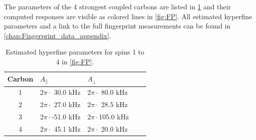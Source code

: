 The parameters of the 4 strongest coupled carbons are listed in \cref{tbl:HF_par} and their computed responses are visible as colored lines in \cref{fig:FP}.
All estimated hyperfine parameters and a link to the full fingerprint measurements can be found in \cref{chap:Fingerprint_data_appendix}.

\begin{table}[htbp]
\centering
    \begin{tabular}{cllll}
    Carbon & \quad \quad  $A_{\parallel} $ & \quad \quad $A_{\perp}$ \\ \hline
    1         & $2 \pi \cdot${ }30.0 kHz             & $2 \pi \cdot${ }80.0 kHz                \\
    2         & $2 \pi \cdot${ }27.0 kHz             & $2 \pi \cdot${ }28.5 kHz              \\
    3         & $2 \pi \cdot$-51.0 kHz          & $2 \pi \cdot$105.0 kHz              \\
    4         & $2 \pi \cdot${ }45.1 kHz           & $2 \pi \cdot${ }20.0 kHz                \\
    \end{tabular}
    \caption{Estimated hyperfine parameters for spins 1 to 4 in \cref{fig:FP}.}
    \label{tbl:HF_par}
\end{table}
